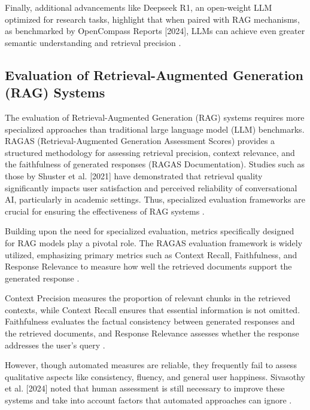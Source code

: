 \begin{refsection}
\hspace{0.4cm}Finally, additional advancements like Deepseek R1, an open-weight LLM optimized for research tasks, highlight that when paired with RAG mechanisms, as benchmarked by OpenCompass Reports [2024], LLMs can achieve even greater semantic understanding and retrieval precision \cite{opencompass2024}.


\subsection{Evaluation of Retrieval-Augmented Generation (RAG) Systems}

\hspace{0.4cm}The evaluation of Retrieval-Augmented Generation (RAG) systems requires more specialized approaches than traditional large language model (LLM) benchmarks. RAGAS (Retrieval-Augmented Generation Assessment Scores) provides a structured methodology for assessing retrieval precision, context relevance, and the faithfulness of generated responses (RAGAS Documentation). Studies such as those by Shuster et al. [2021] have demonstrated that retrieval quality significantly impacts user satisfaction and perceived reliability of conversational AI, particularly in academic settings. Thus, specialized evaluation frameworks are crucial for ensuring the effectiveness of RAG systems \cite{shuster2021retrieval}.

\hspace{0.4cm}Building upon the need for specialized evaluation, metrics specifically designed for RAG models play a pivotal role. The RAGAS evaluation framework is widely utilized, emphasizing primary metrics such as Context Recall, Faithfulness, and Response Relevance to measure how well the retrieved documents support the generated response \cite{roychowdhury2024evaluation}.

Context Precision measures the proportion of relevant chunks in the retrieved contexts, while Context Recall ensures that essential information is not omitted. Faithfulness evaluates the factual consistency between generated responses and the retrieved documents, and Response Relevance assesses whether the response addresses the user's query \cite{aquino2024extracting} \cite{deepak2025langchain}.

\hspace{0.4cm}However, though automated measures are reliable, they frequently fail to assess qualitative aspects like consistency, fluency, and general user happiness.  Sivasothy et al. [2024] noted that human assessment is still necessary to improve these systems and take into account factors that automated approaches can ignore \cite{sivasothy2024ragprobe}.


\end{refsection}
